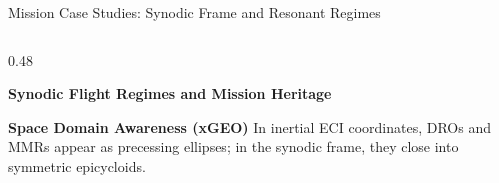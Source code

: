 \documentclass[aspectratio=169, 10pt]{beamer}
\begin{document}
\begin{frame}{Mission Case Studies: Synodic Frame and Resonant Regimes}
\begin{columns}[t]
        \begin{column}{0.48\textwidth}
            \begin{exampleblock}{\textbf{Synodic Flight Regimes and Mission Heritage}}
                \scriptsize
                \centering
            \end{exampleblock}
            \vspace{0.05cm}
            \begin{alertblock}{\textbf{Space Domain Awareness (xGEO)}}
                \scriptsize
                In inertial ECI coordinates, DROs and MMRs appear as precessing ellipses; in the synodic frame, they close into symmetric epicycloids.
            \end{alertblock}
        \end{column}
    \end{columns}
\end{frame}
\end{document}
